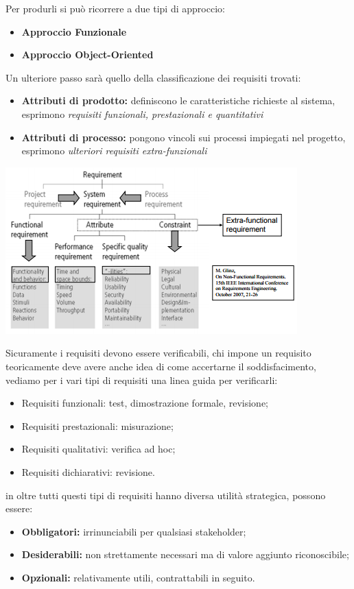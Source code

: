 Per produrli si può  ricorrere a due tipi di approccio:
\begin{itemize}
	\item \textbf{Approccio Funzionale}
	\item \textbf{Approccio Object-Oriented}
\end{itemize}

Un ulteriore passo sarà quello della classificazione dei requisiti trovati:
\begin{itemize}
	\item \textbf{Attributi di prodotto:} definiscono le caratteristiche richieste al sistema, esprimono \textit{requisiti funzionali, prestazionali e quantitativi} 
	\item \textbf{Attributi di processo:} pongono vincoli sui processi impiegati nel progetto, esprimono \textit{ulteriori requisiti extra-funzionali}
\end{itemize}

\includegraphics[width=0.75\columnwidth]{img2}

Sicuramente i requisiti devono essere verificabili, chi impone un requisito teoricamente deve avere anche idea di come accertarne il soddisfacimento, vediamo per i vari tipi di requisiti una linea guida per verificarli:

\begin{itemize}
	\item Requisiti funzionali: test, dimostrazione formale, revisione;
	\item Requisiti prestazionali: misurazione;
	\item Requisiti qualitativi: verifica ad hoc;
	\item Requisiti dichiarativi: revisione.
\end{itemize}
in oltre tutti questi tipi di requisiti hanno diversa utilità strategica, possono essere:
\begin{itemize}
	\item \textbf{Obbligatori:} irrinunciabili per qualsiasi stakeholder;
	\item \textbf{Desiderabili:} non strettamente necessari ma di valore aggiunto riconoscibile;
	\item \textbf{Opzionali:} relativamente utili, contrattabili in seguito.
\end{itemize}

